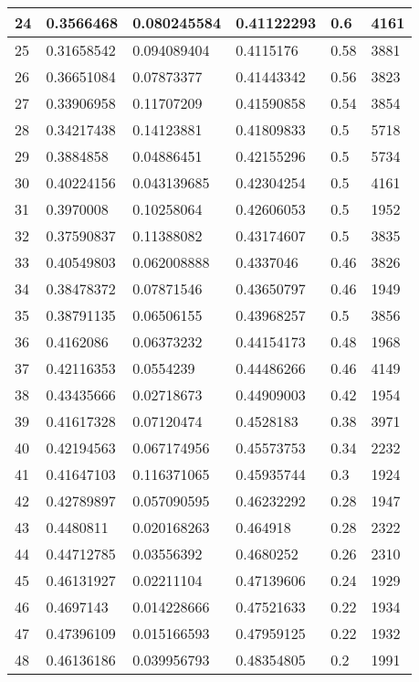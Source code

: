 \begin{longtable}{|l|l|l|l|l|l|}
24 & 0.3566468 & 0.080245584 & 0.41122293 & 0.6 & 4161 \\ \hline 
25 & 0.31658542 & 0.094089404 & 0.4115176 & 0.58 & 3881 \\ \hline 
26 & 0.36651084 & 0.07873377 & 0.41443342 & 0.56 & 3823 \\ \hline 
27 & 0.33906958 & 0.11707209 & 0.41590858 & 0.54 & 3854 \\ \hline 
28 & 0.34217438 & 0.14123881 & 0.41809833 & 0.5 & 5718 \\ \hline 
29 & 0.3884858 & 0.04886451 & 0.42155296 & 0.5 & 5734 \\ \hline 
30 & 0.40224156 & 0.043139685 & 0.42304254 & 0.5 & 4161 \\ \hline 
31 & 0.3970008 & 0.10258064 & 0.42606053 & 0.5 & 1952 \\ \hline 
32 & 0.37590837 & 0.11388082 & 0.43174607 & 0.5 & 3835 \\ \hline 
33 & 0.40549803 & 0.062008888 & 0.4337046 & 0.46 & 3826 \\ \hline 
34 & 0.38478372 & 0.07871546 & 0.43650797 & 0.46 & 1949 \\ \hline 
35 & 0.38791135 & 0.06506155 & 0.43968257 & 0.5 & 3856 \\ \hline 
36 & 0.4162086 & 0.06373232 & 0.44154173 & 0.48 & 1968 \\ \hline 
37 & 0.42116353 & 0.0554239 & 0.44486266 & 0.46 & 4149 \\ \hline 
38 & 0.43435666 & 0.02718673 & 0.44909003 & 0.42 & 1954 \\ \hline 
39 & 0.41617328 & 0.07120474 & 0.4528183 & 0.38 & 3971 \\ \hline 
40 & 0.42194563 & 0.067174956 & 0.45573753 & 0.34 & 2232 \\ \hline 
41 & 0.41647103 & 0.116371065 & 0.45935744 & 0.3 & 1924 \\ \hline 
42 & 0.42789897 & 0.057090595 & 0.46232292 & 0.28 & 1947 \\ \hline 
43 & 0.4480811 & 0.020168263 & 0.464918 & 0.28 & 2322 \\ \hline 
44 & 0.44712785 & 0.03556392 & 0.4680252 & 0.26 & 2310 \\ \hline 
45 & 0.46131927 & 0.02211104 & 0.47139606 & 0.24 & 1929 \\ \hline 
46 & 0.4697143 & 0.014228666 & 0.47521633 & 0.22 & 1934 \\ \hline 
47 & 0.47396109 & 0.015166593 & 0.47959125 & 0.22 & 1932 \\ \hline 
48 & 0.46136186 & 0.039956793 & 0.48354805 & 0.2 & 1991 \\ \hline 

\end{longtable}
